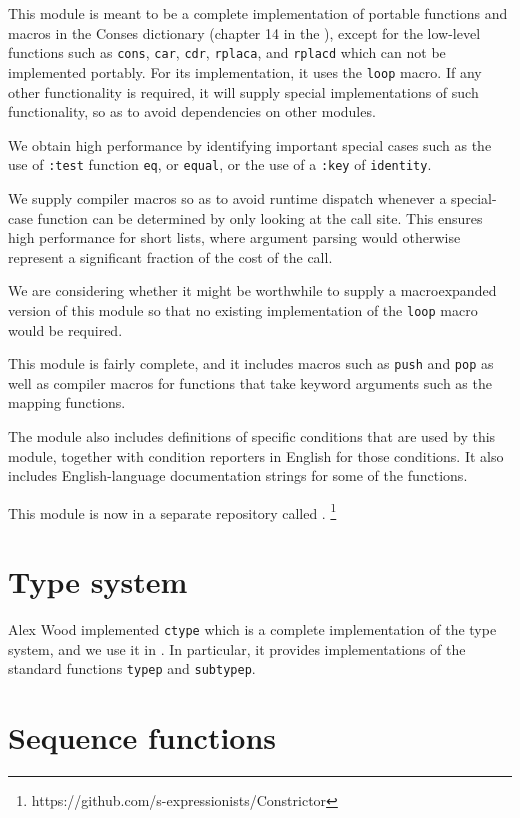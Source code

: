 This module is meant to be a complete implementation of portable
functions and macros in the Conses dictionary (chapter 14 in the
\hs{}), except for the low-level functions such as \texttt{cons},
\texttt{car}, \texttt{cdr}, \texttt{rplaca}, and \texttt{rplacd} which
can not be implemented portably.  For its implementation, it uses the
\texttt{loop} macro.  If any other functionality is required, it will
supply special implementations of such functionality, so as to avoid
dependencies on other modules.

We obtain high performance by identifying important special
cases such as the use of \texttt{:test} function \texttt{eq}, or
\texttt{equal}, or the use of a \texttt{:key} of \texttt{identity}.

We supply compiler macros so as to avoid runtime dispatch whenever a
special-case function can be determined by only looking at the call
site.  This ensures high performance for short lists, where argument
parsing would otherwise represent a significant fraction of the cost
of the call.

We are considering whether it might be worthwhile to supply a
macroexpanded version of this module so that no existing
implementation of the \texttt{loop} macro would be required. 

This module is fairly complete, and it includes macros such as
\texttt{push} and \texttt{pop} as well as compiler macros for
functions that take keyword arguments such as the mapping functions. 

The module also includes definitions of specific conditions that are
used by this module, together with condition reporters in English for
those conditions.  It also includes English-language documentation
strings for some of the functions. 

This module is now in a separate repository called \constrictor{}.%
\footnote{https://github.com/s-expressionists/Constrictor}

\section{Type system}
\label{sec-type-system}

Alex Wood implemented \texttt{ctype} which is a complete
implementation of the \commonlisp{} type system, and we use it in
\sysname{}.  In particular, it provides implementations of the
standard functions \texttt{typep} and \texttt{subtypep}.

\section{Sequence functions}
\label{sec-sequence-functions}


